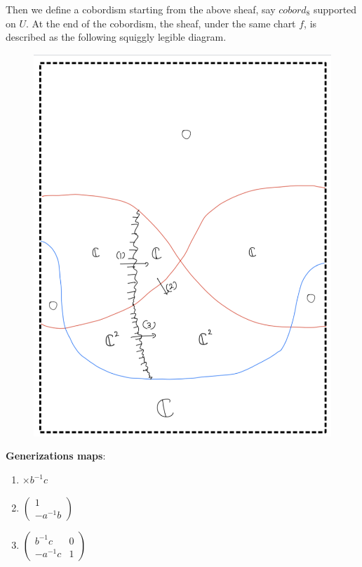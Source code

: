 Then we define a cobordism starting from the above sheaf, say $cobord_8$ supported on $U$. At the end of the cobordism, the sheaf, under the same chart $f$, is described as the following squiggly legible diagram.

\begin{figure}[H]
    \centering
    \includegraphics[scale = 0.85]{diagrams/cobord8/11.png}
    \caption{}
    \label{fig:your-label}
\end{figure}
\textbf{Generizations maps}:
\begin{enumerate}[label = (\arabic*)]
\item $\times b^{-1}c$
\item 
$\begin{pmatrix}
1\\
-a^{-1}b
\end{pmatrix}$

\item 
$\begin{pmatrix}
b^{-1}c & 0\\
-a^{-1}c & 1
\end{pmatrix}$
\end{enumerate}
